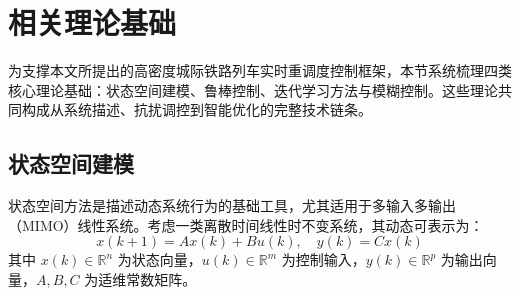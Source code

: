 



\section{相关理论基础}

为支撑本文所提出的高密度城际铁路列车实时重调度控制框架，本节系统梳理四类核心理论基础：状态空间建模、鲁棒控制、迭代学习方法与模糊控制。这些理论共同构成从系统描述、抗扰调控到智能优化的完整技术链条。

\subsection{状态空间建模}

状态空间方法是描述动态系统行为的基础工具，尤其适用于多输入多输出（MIMO）线性系统。考虑一类离散时间线性时不变系统，其动态可表示为：
\begin{equation}\label{eq:state_space}
x(k+1) = A x(k) + B u(k), \quad y(k) = C x(k)
\end{equation}
其中 $x(k) \in \mathbb{R}^n$ 为状态向量，$u(k) \in \mathbb{R}^m$ 为控制输入，$y(k) \in \mathbb{R}^p$ 为输出向量，$A, B, C$ 为适维常数矩阵。

